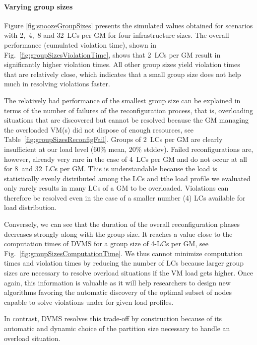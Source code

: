\paragraph{Varying group sizes}

Figure \ref{fig:snoozeGroupSizes} presents the simulated values
obtained for scenarios with 2,~4,~8 and 32~LCs per GM for four
infrastructure sizes. The overall performance (\ie cumulated violation
time), shown in Fig.~\ref{fig:groupSizesViolationTime}, shows that
2~LCs per GM result in significantly higher violation times. All other
group sizes yield violation times that are relatively close, which
indicates that a small group size does not help much in
resolving violations faster.

The relatively bad performance of the smallest group size can be
explained in terms of the number of failures of the reconfiguration
process, that is, overloading situations that are discovered but
cannot be resolved because the GM managing the overloaded VM(s) did
not dispose of enough resources, see
Table~\ref{fig:groupSizesReconfigFail}. Groups of 2~LCs per GM are
clearly insufficient at our load level (60\% mean, 20\% stddev).
Failed reconfigurations are, however, already very rare in the case of
4~LCs per GM and do not occur at all for 8~and 32~LCs per GM. This is
understandable because the load is statistically evenly distributed
among the LCs and tthe load profile we evaluated only rarely results
in many LCs of a GM to be overloaded. Violations can therefore be
resolved even in the case of a smaller number (4) LCs available for
load distribution.

Conversely, we can see that the duration of the overall
reconfiguration phases decreases strongly along with the group
size. It reaches a value close to the computation times of DVMS for a
group size of 4-LCs per GM, see Fig.~\ref{fig:groupSizesComputationTime}.
We thus cannot minimize computation times and violation times by
reducing the number of LCs because larger group sizes are necessary to
resolve overload situations if the VM load gets higher.  Once again,
this information is valuable as it will help researchers to design new
algorithms favoring the automatic discovery of the optimal subset of
nodes capable to solve violations under for given load profiles.

In contrast, DVMS resolves this trade-off by construction because of its
automatic and dynamic choice of the partition size necessary to handle
an overload situation.



